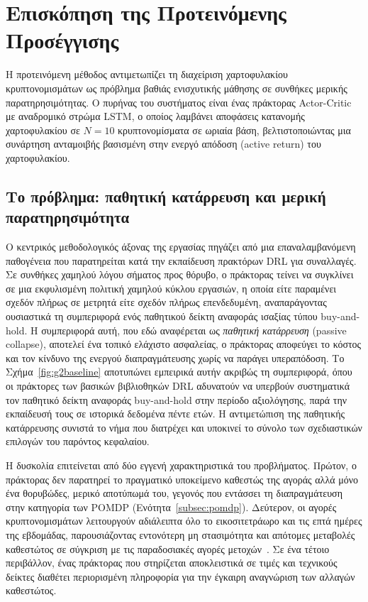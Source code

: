 \section{Επισκόπηση της Προτεινόμενης Προσέγγισης}
\label{sec:overview}

Η προτεινόμενη μέθοδος αντιμετωπίζει τη διαχείριση χαρτοφυλακίου
κρυπτονομισμάτων ως πρόβλημα βαθιάς ενισχυτικής μάθησης σε συνθήκες μερικής
παρατηρησιμότητας. Ο πυρήνας του συστήματος είναι ένας πράκτορας
Actor-Critic με αναδρομικό στρώμα LSTM, ο οποίος λαμβάνει αποφάσεις κατανομής
χαρτοφυλακίου σε $N = 10$ κρυπτονομίσματα σε ωριαία βάση, βελτιστοποιώντας
μια συνάρτηση ανταμοιβής βασισμένη στην ενεργό απόδοση (active return) του
χαρτοφυλακίου.

\subsection{Το πρόβλημα: παθητική κατάρρευση και μερική παρατηρησιμότητα}

Ο κεντρικός μεθοδολογικός άξονας της εργασίας πηγάζει από μια
επαναλαμβανόμενη παθογένεια που παρατηρείται κατά την εκπαίδευση πρακτόρων
DRL για συναλλαγές. Σε συνθήκες χαμηλού λόγου σήματος προς θόρυβο, ο
πράκτορας τείνει να συγκλίνει σε μια εκφυλισμένη πολιτική χαμηλού κύκλου
εργασιών, η οποία είτε παραμένει σχεδόν πλήρως σε μετρητά είτε σχεδόν πλήρως
επενδεδυμένη, αναπαράγοντας ουσιαστικά τη συμπεριφορά ενός παθητικού δείκτη
αναφοράς ισαξίας τύπου buy-and-hold. Η συμπεριφορά αυτή, που εδώ αναφέρεται
ως \emph{παθητική κατάρρευση} (passive collapse), αποτελεί ένα τοπικό
ελάχιστο ασφαλείας, ο πράκτορας αποφεύγει το κόστος και τον κίνδυνο της
ενεργού διαπραγμάτευσης χωρίς να παράγει υπεραπόδοση. Το
Σχήμα~\ref{fig:g2baseline} αποτυπώνει εμπειρικά αυτήν ακριβώς τη
συμπεριφορά, όπου οι πράκτορες των βασικών βιβλιοθηκών DRL αδυνατούν να
υπερβούν συστηματικά τον παθητικό δείκτη αναφοράς buy-and-hold στην
περίοδο αξιολόγησης, παρά την εκπαίδευσή τους σε ιστορικά δεδομένα
πέντε ετών. Η αντιμετώπιση της παθητικής κατάρρευσης συνιστά το νήμα
που διατρέχει και υποκινεί το σύνολο των σχεδιαστικών επιλογών του
παρόντος κεφαλαίου.

Η δυσκολία επιτείνεται από δύο εγγενή χαρακτηριστικά του προβλήματος.
Πρώτον, ο πράκτορας δεν παρατηρεί το πραγματικό υποκείμενο καθεστώς της
αγοράς αλλά μόνο ένα θορυβώδες, μερικό αποτύπωμά του, γεγονός που εντάσσει τη
διαπραγμάτευση στην κατηγορία των POMDP (Ενότητα~\ref{subsec:pomdp}). Δεύτερον, οι αγορές
κρυπτονομισμάτων λειτουργούν αδιάλειπτα όλο το εικοσιτετράωρο και τις επτά
ημέρες της εβδομάδας, παρουσιάζοντας εντονότερη μη στασιμότητα και απότομες
μεταβολές καθεστώτος σε σύγκριση με τις παραδοσιακές αγορές μετοχών~\cite{liutsyvinski2021, griffin2020bitcoin}. Σε ένα
τέτοιο περιβάλλον, ένας πράκτορας που στηρίζεται αποκλειστικά σε τιμές και
τεχνικούς δείκτες διαθέτει περιορισμένη πληροφορία για την έγκαιρη
αναγνώριση των αλλαγών καθεστώτος.

